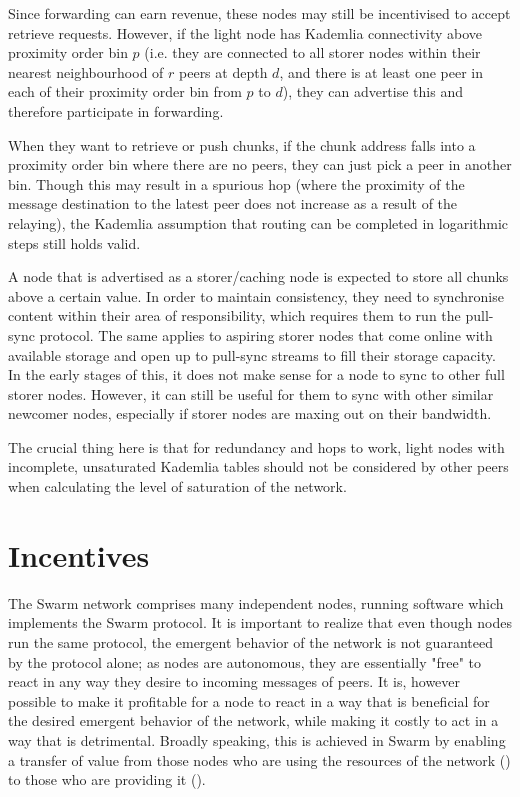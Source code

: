 Since forwarding can earn revenue, these nodes may still be incentivised to accept retrieve requests. However, if the light node has Kademlia connectivity above proximity order bin $p$ (i.e. they  are connected to all storer nodes within their nearest neighbourhood of $r$ peers at depth $d$, and there is at least one peer in each of their proximity order bin from $p$ to $d$), they can advertise this and therefore participate in forwarding. 

When they want to retrieve or push chunks, if the chunk address falls into a proximity order bin where there are no peers, they can just pick a  peer in another bin. Though this may result in a spurious hop (where the proximity of the message  destination to the latest peer does not increase as a result of the relaying), the Kademlia assumption that routing can be completed in logarithmic steps still holds valid.

A node that is advertised as a storer/caching node is expected to store all chunks  above a certain value. In order to maintain consistency, they need to synchronise content within their area of responsibility, which requires them to run the pull-sync protocol. The same applies to aspiring storer nodes that come online with available storage and open up to pull-sync streams to fill their storage capacity. In the early stages of this, it does not make sense for a node to sync to other full storer nodes. However, it can still be useful for them to sync with other similar newcomer nodes, especially if storer nodes are maxing out on their bandwidth.

The crucial thing here is that for redundancy and hops to work, light nodes with incomplete, unsaturated Kademlia tables should not be considered by other peers when calculating the level of saturation of the network.


\chapter{Incentives}\label{sec:incentivisation}
The Swarm network comprises many independent nodes, running software which implements the Swarm protocol. It is important to realize that even though nodes run the same protocol, the emergent behavior of the network is not guaranteed by the protocol alone; as nodes are autonomous, they are essentially "free" to react in any way they desire to incoming messages of peers.
It is, however possible to make it profitable for a node to react in a way that is beneficial for the desired emergent behavior of the network, while making it costly to act in a way that is detrimental. Broadly speaking, this is achieved in Swarm by enabling a transfer of value from those nodes who are using the resources of the network () to those who are providing it (). 


